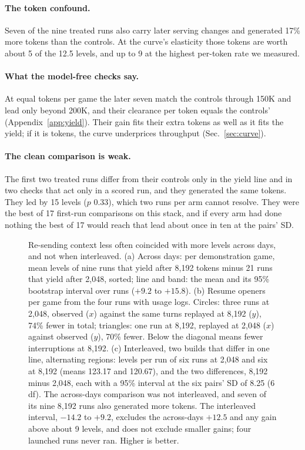 \paragraph{The token confound.}
Seven of the nine treated runs also carry later serving changes and generated 17\% more tokens than the controls. %
At the curve's elasticity those tokens are worth about 5 of the 12.5 levels, and up to 9 at the highest per-token rate we measured. %

\paragraph{What the model-free checks say.}
At equal tokens per game the later seven match the controls through 150K and lead only beyond 200K, and their clearance per token equals the controls' (Appendix~\ref{app:yield}). %
Their gain fits their extra tokens as well as it fits the yield; if it is tokens, the curve underprices throughput (Sec.~\ref{sec:curve}).

\paragraph{The clean comparison is weak.}
The first two treated runs differ from their controls only in the yield line and in two checks that act only in a scored run, and they generated the same tokens. %
They led by 15 levels ($p$ 0.33), which two runs per arm cannot resolve. %
They were the best of 17 first-run comparisons on this stack, and if every arm had done nothing the best of 17 would reach that lead about once in ten at the pairs' SD. %

\begin{figure}[t]
\centering
{}
\caption{Re-sending context less often coincided with more levels across days, and not when interleaved. (a) Across days: per demonstration game, mean levels of nine runs that yield after 8,192 tokens minus 21 runs that yield after 2,048, sorted; line and band: the mean and its 95\% bootstrap interval over runs ($+9.2$ to $+15.8$). (b) Resume openers per game from the four runs with usage logs. Circles: three runs at 2,048, observed ($x$) against the same turns replayed at 8,192 ($y$), 74\% fewer in total; triangles: one run at 8,192, replayed at 2,048 ($x$) against observed ($y$), 70\% fewer. Below the diagonal means fewer interruptions at 8,192. (c) Interleaved, two builds that differ in one line, alternating regions: levels per run of six runs at 2,048 and six at 8,192 (means 123.17 and 120.67), and the two differences, 8,192 minus 2,048, each with a 95\% interval at the six pairs' SD of 8.25 (6 df). The across-days comparison was not interleaved, and seven of its nine 8,192 runs also generated more tokens. The interleaved interval, $-14.2$ to $+9.2$, excludes the across-days $+12.5$ and any gain above about 9 levels, and does not exclude smaller gains; four launched runs never ran. Higher is better.}\label{fig:yield} %
\end{figure}


